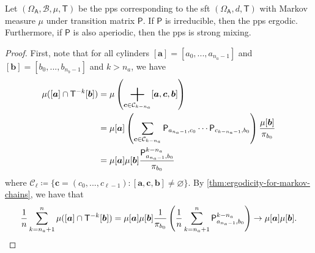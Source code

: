 \documentclass[a4paper]{article}
\begin{document}
\begin{corollary}\label{cor:ireeducible-iff-ergodicity}
	Let $(\Omega_{\mathsf{A}},\mathcal{B},\mu,\mathsf{T})$ be the \gls{pps} corresponding to
	the \gls{sft} $(\Omega_{\mathsf{A}},d,\mathsf{T})$
	with Markov measure $\mu$ under transition matrix $\mathsf{P}$.
	If $\mathsf{P}$ is irreducible, then the \gls{pps} ergodic.
	Furthermore, if $\mathsf{P}$ is also aperiodic, then the \gls{pps} is strong mixing.
\end{corollary}
\begin{proof}
	First, note that
	for all cylinders $[\boldsymbol{a}]=[a_0,...,a_{n_a-1}]$ and $[\boldsymbol{b}]=[b_{0},...,b_{n_b-1}]$ and $k>n_a$,
	we have
	\begin{align}
		\mu([\boldsymbol{a}]\cap\mathsf{T}\inv[k][\boldsymbol{b}])
		&= \mu\left(\bigplus_{\boldsymbol{c}\in\mathcal{C}_{k-n_a}}[\boldsymbol{a},\boldsymbol{c},\boldsymbol{b}]\right) \nonumber\\
		&= \mu[\boldsymbol{a}]
		\left( \sum_{\boldsymbol{c}\in\mathcal{C}_{k-n_a}} \mathsf{P}_{a_{n_a-1},c_0}\cdots\mathsf{P}_{c_{k-n_a-1},b_0} \right)
		\frac{ \mu[\boldsymbol{b}] }{ \pi_{b_0} } \nonumber\\
		&= \mu[\boldsymbol{a}] \mu[\boldsymbol{b}] \frac{ \mathsf{P}_{a_{n_a-1},b_0}^{k-n_a} }{ \pi_{b_0} }
		\label{eq:cylinders-rearrange}
	\end{align}
	where $\mathcal{C}_{\ell} \coloneqq \{\boldsymbol{c}=(c_0,...,c_{\ell-1}):[\boldsymbol{a},\boldsymbol{c},\boldsymbol{b}]\neq\varnothing\}$.
	By \autoref{thm:ergodicity-for-markov-chains}, we have that
	\begin{align*}
		\frac1n \sum_{k=n_a+1}^{n} \mu([\boldsymbol{a}]\cap\mathsf{T}\inv[k][\boldsymbol{b}])
		= \mu[\boldsymbol{a}] \mu[\boldsymbol{b}] \frac1{\pi_{b_0}} \left( \frac1n\sum_{k=n_a+1}^{n} \mathsf{P}_{a_{n_a-1},b_0}^{k-n_a} \right)
		\to \mu[\boldsymbol{a}] \mu[\boldsymbol{b}].
	\end{align*}


\end{proof}
\end{document}

